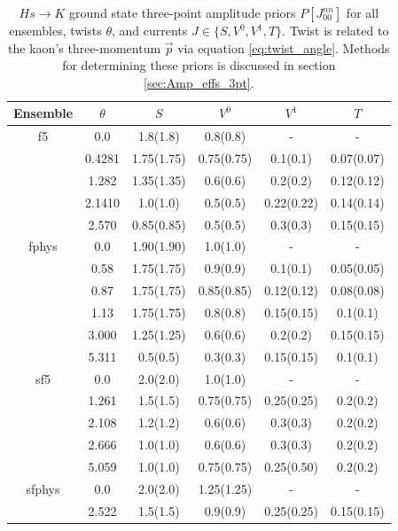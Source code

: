 \begin{table}[]
    \centering
    \caption{$Hs\rightarrow K$ ground state three-point amplitude priors $P[J_{00}^{nn}]$ for all ensembles, twists $\theta$, and currents $J \in \{S,V^0,V^1,T\}$.  Twist is related to the kaon's three-momentum $\vec{p}$ via equation \ref{eq:twist_angle}.  Methods for determining these priors is discussed in section \ref{sec:Amp_effs_3pt}.}
    \label{tab:3ptpriors_HsK}
    \begin{tabular}{c c | c c c c}
    \hline
    \hline
    Ensemble & $\theta$ & $S$ & $V^0$ & $V^1$ & $T$ \\
    \hline
    \hline
    f5 & 0.0    & 1.8(1.8)   & 0.8(0.8)   & -          & -   \\
       & 0.4281 & 1.75(1.75) & 0.75(0.75) & 0.1(0.1)   & 0.07(0.07) \\
       & 1.282  & 1.35(1.35) & 0.6(0.6)   & 0.2(0.2)   & 0.12(0.12) \\
       & 2.1410 & 1.0(1.0)   & 0.5(0.5)   & 0.22(0.22) & 0.14(0.14) \\
       & 2.570  & 0.85(0.85) & 0.5(0.5)   & 0.3(0.3)   & 0.15(0.15)\\
    \hline
    fphys & 0.0   & 1.90(1.90) & 1.0(1.0)   & -          & -         \\
          & 0.58  & 1.75(1.75) & 0.9(0.9)   & 0.1(0.1)   & 0.05(0.05) \\
          & 0.87  & 1.75(1.75) & 0.85(0.85) & 0.12(0.12) & 0.08(0.08) \\
          & 1.13  & 1.75(1.75) & 0.8(0.8)   & 0.15(0.15) & 0.1(0.1) \\
          & 3.000 & 1.25(1.25) & 0.6(0.6)   & 0.2(0.2)   & 0.15(0.15) \\
          & 5.311 & 0.5(0.5)   & 0.3(0.3)   & 0.15(0.15) & 0.1(0.1)\\
    \hline
    sf5   & 0.0   & 2.0(2.0) & 1.0(1.0)   & -          & - \\
          & 1.261 & 1.5(1.5) & 0.75(0.75) & 0.25(0.25) & 0.2(0.2)\\ 
          & 2.108 & 1.2(1.2) & 0.6(0.6)   & 0.3(0.3)   & 0.2(0.2)\\ 
          & 2.666 & 1.0(1.0) & 0.6(0.6)   & 0.3(0.3)   & 0.2(0.2)\\ 
          & 5.059 & 1.0(1.0) & 0.75(0.75) & 0.25(0.50) & 0.2(0.2)\\
    \hline
    sfphys & 0.0    & 2.0(2.0)   & 1.25(1.25) & -          & - \\
           & 2.522  & 1.5(1.5)   & 0.9(0.9)   & 0.25(0.25) & 0.15(0.15)\\ 

\end{tabular}
\end{table}
